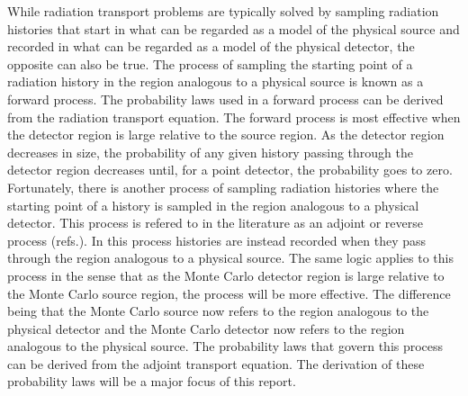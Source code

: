 While radiation transport problems are typically solved by sampling radiation
histories that start in what can be regarded as a model of the physical source
and recorded in what can be regarded as a model of the physical detector, the
opposite can also be true. The process of sampling the starting point of a 
radiation history in 
the region analogous to a physical source is known as a forward process. The
probability laws used in a forward process can be derived from the radiation
transport equation. The forward process is most effective when the detector 
region is large relative to the source region. As the detector region decreases
in size, the probability of any given history passing through the detector 
region decreases until, for a point detector, the probability goes to zero. 
Fortunately, there is another process of sampling radiation histories where the 
starting point of a history is sampled in the region analogous to a physical
detector. This process is refered to in the literature as an adjoint or reverse
process (refs.). In this process histories are instead recorded when they pass
through the region analogous to a physical source. The same logic applies to 
this process in the sense that as the Monte Carlo detector region is large 
relative to the Monte Carlo source region, the process will be more effective. 
The difference being that the Monte Carlo source now refers to the region
analogous to the physical detector and the Monte Carlo detector now refers to
the region analogous to the physical source. The probability laws that govern 
this process can be derived from the adjoint transport equation. The derivation
of these probability laws will be a major focus of this report.

